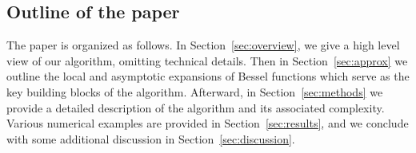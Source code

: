 \subsection*{Outline of the paper}

The paper is organized as follows. In Section~\ref{sec:overview}, we give a high
level view of our algorithm, omitting technical details. Then in
Section~\ref{sec:approx} we outline the local and asymptotic expansions of
Bessel functions which serve as the key building blocks of the algorithm.
Afterward, in Section~\ref{sec:methods} we provide a detailed description of the
algorithm and its associated complexity. Various numerical examples are provided
in Section~\ref{sec:results}, and we conclude with some additional discussion in
Section~\ref{sec:discussion}.


